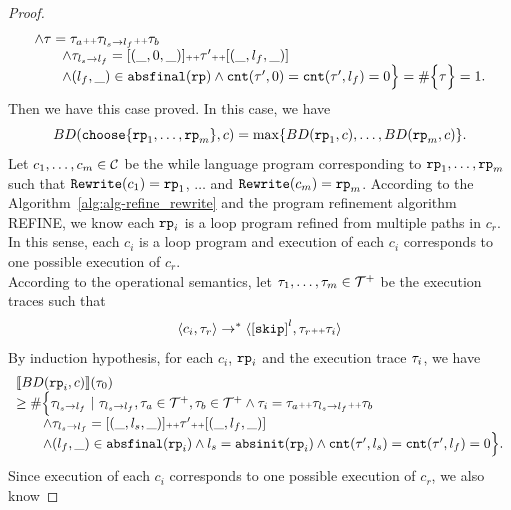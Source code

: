 \begin{proof}
\[\begin{array}{l}
    \land \mathtt{\tau} = \mathtt{\tau}_a {\scriptscriptstyle ++} \mathtt{\tau}_{l_s \to l_f} {\scriptscriptstyle ++} \mathtt{\tau}_b
    \\ \qquad
    \land \mathtt{\tau}_{l_s \to l_f} = [(\_, 0, \_)] {\scriptscriptstyle ++} \mathtt{\tau}' {\scriptscriptstyle ++} [(\_, l_f, \_)]
    \\ \qquad
    \land (l_{f}, \_) \in \mathtt{abs}{\mathtt{final}}(\mathtt{rp})
    \land \mathtt{cnt}(\mathtt{\tau}', 0) = \mathtt{cnt}(\mathtt{\tau}', l_f) = 0 
    \Big\}
     = \# \Big\{\mathtt{\tau} \Big\} = 1.
  \end{array}
\]
Then we have this case proved.
In this case, we have
\[
  BD(\rpchoose{\rprog_1, \ldots, \rprog_m}, c) = \max\left\{ BD(\rprog_1, c), \ldots, BD(\rprog_m, c) \right\}.
\]
Let $c_1, \ldots, c_m \in \mathcal{C}$ be the while language program corresponding to $\mathtt{rp}_1, \ldots, \mathtt{rp}_m$ such that $\mathtt{Rewrite}(c_1) = \mathtt{rp}_1$, $\ldots$ and  $\mathtt{Rewrite}(c_m) = \mathtt{rp}_m$.
According to the Algorithm~\ref{alg:alg-refine_rewrite} and the program refinement algorithm REFINE, we know each $\mathtt{rp}_i$ is a loop program refined from multiple paths in $c_r$.
\\
In this sense, each $c_i$ is a loop program and execution of each $c_i$ corresponds to one possible execution of $c_r$.
\\
According to the operational semantics, let $\mathtt{\tau}_1, \ldots, \mathtt{\tau}_m \in \mathcal{T}^{+}$ be the execution traces such that 
\[
  \config{c_i, \trace_r} \to^* 
  \config{\clabel{\eskip}^{l}, \trace_r \tracecat \trace_i}
\]
By induction hypothesis, for each $c_i$, $\mathtt{rp}_i$ and the execution trace $\mathtt{\tau}_i$, we have 
\[
  \begin{array}{l}
  \llbracket BD(\mathtt{rp}_i, c) \rrbracket(\mathtt{\tau}_0) 
  \\ \geq
  \# \Big\{\mathtt{\tau}_{l_s \to l_f} ~\vert~ \mathtt{\tau}_{l_s \to l_f}, \mathtt{\tau}_a \in \mathcal{T}^{+}, \mathtt{\tau}_b \in \mathcal{T}^{+}
  \land \mathtt{\tau}_i = \mathtt{\tau}_a {\scriptscriptstyle ++} \mathtt{\tau}_{l_s \to l_f} {\scriptscriptstyle ++} \mathtt{\tau}_b
  \\ \qquad
  \land \mathtt{\tau}_{l_s \to l_f} = [(\_, l_s, \_)] {\scriptscriptstyle ++} \mathtt{\tau}' {\scriptscriptstyle ++} [(\_, l_f, \_)]
  \\ \qquad
  \land (l_{f}, \_) \in \mathtt{abs}{\mathtt{final}}(\mathtt{rp}_i)
  \land l_s = \mathtt{abs}{\mathtt{init}}(\mathtt{rp}_i)
  \land \mathtt{cnt}(\mathtt{\tau}', l_s) = \mathtt{cnt}(\mathtt{\tau}', l_f) = 0 
  \Big\}.
  \end{array}
\]
Since execution of each $c_i$ corresponds to one possible execution of $c_r$, we also know

\end{proof}
